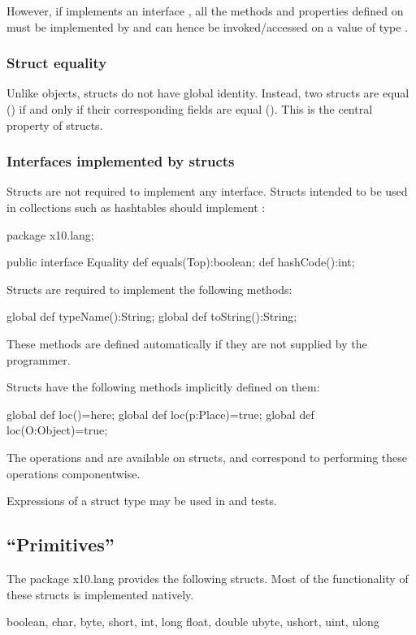 However,
if  implements an interface , all the methods and properties defined
on  must be implemented by  and can hence be invoked/accessed on a
value of type . 

\subsubsection{Struct equality}

Unlike objects, structs do not have global identity. Instead, two
structs are equal (\Xcd{==}) if and only if their corresponding fields are
equal (\Xcd{==}). This is the central property of structs.

\subsubsection{Interfaces implemented by structs}
Structs are not required to implement any interface. Structs intended
to be used in collections such as hashtables should implement
:
\begin{xten}
package x10.lang;  

public interface Equality {
    def equals(Top):boolean;
    def hashCode():int;
}
\end{xten}
Structs are required to implement the following methods: 
\begin{xten}
  global def typeName():String;
  global def toString():String;  
\end{xten}
These methods are defined automatically if they are not supplied by the programmer.

Structs have the following methods implicitly defined on them:
\begin{xten}
  global def loc()=here;
  global def loc(p:Place)=true;
  global def loc(O:Object)=true;
\end{xten}

The operations \Xcd{==} and \Xcd{!=} are available on structs, and
correspond to performing these operations componentwise.

Expressions  of a struct type may be used in  and  tests.

\subsection{``Primitives''}

The package x10.lang provides the following structs. Most of the functionality of these structs is implemented natively. 
\begin{xten}
boolean, char, 
byte, short, int, long
float, double
ubyte, ushort, uint, ulong
\end{xten}
 
